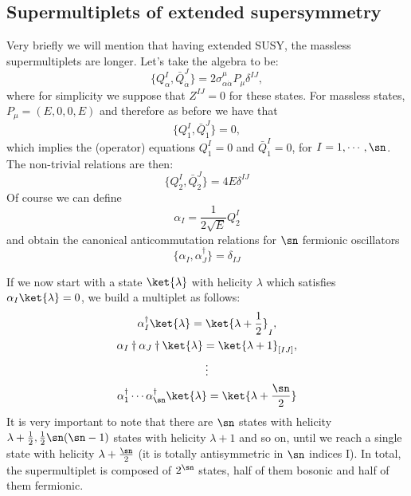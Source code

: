 \subsection{Supermultiplets of extended supersymmetry}
Very briefly we will mention that having extended SUSY, the massless
supermultiplets are longer. Let's take the algebra to be:
\begin{equation}
  \{Q_\alpha^I,\bar{Q}_{\dot{\alpha}}^J\} = 2\sigma_{\alpha\dot{\alpha}}^\mu
  P_\mu\delta^{IJ},
\end{equation}
where for simplicity we suppose that $Z^{IJ}=0$ for these states. For massless
states, $P_\mu = (E,0,0,E)$ and therefore as before we have that
\begin{equation}
  \{Q_1^I,\bar{Q}_{\dot{1}}^J\} = 0,
\end{equation}
which implies the (operator) equations $Q_1^I=0$ and $\bar{Q}_{\dot{1}}^I=0$,
for $I=1,\cdots,\sn$. The non-trivial relations are then:
\begin{equation}
\{Q_2^I, \bar{Q}_{\dot{2}}^J\} = 4E\delta^{IJ}
\end{equation}
Of course we can define
\begin{equation}
  \alpha_I = \frac{1}{2\sqrt{E}}Q_2^I
\end{equation}
and obtain the canonical anticommutation relations for $\sn$ fermionic
oscillators
\begin{equation}
  \{\alpha_I,\alpha_J^\dagger\} = \delta_{IJ}
\end{equation}
\par If we now start with a state $\ket{\lambda}$ with helicity $\lambda$ which
satisfies $\alpha_I\ket{\lambda} = 0$, we build a multiplet as follows:
\begin{gather}
  \alpha_I^\dagger\ket{\lambda} = \ket{\lambda + \frac{1}{2}}_I,\nonumber\\
  \alpha_I\dagger\alpha_J\dagger\ket{\lambda} = \ket{\lambda
  + 1}_{[IJ]},\nonumber\\
  \vdots\nonumber\\
  \alpha_1^\dagger\cdots\alpha_{\sn}^\dagger\ket{\lambda}
  = \ket{\lambda+\frac{\sn}{2}}
\end{gather}
It is very important to note that there are $\sn$ states with helicity
$\lambda + \frac{1}{2}, \frac{1}{2}\sn(\sn-1)$ states with
helicity $\lambda + 1$ and so on, until we reach a single state with helicity $\lambda
+\frac{\sn}{2}$ (it is totally antisymmetric in $\sn$ indices
I). In total, the supermultiplet is composed of $2^\sn$ states, half of
them bosonic and half of them fermionic.

